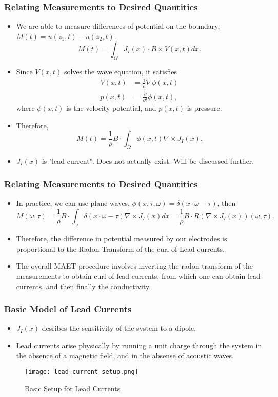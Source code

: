 \documentclass[]{beamer}
\begin{document}
 \begin{frame}
  \frametitle{Relating Measurements to Desired Quantities}
  \begin{itemize}
  \item We are able to measure differences of potential on the boundary, $M(t) = u(z_1,t)-u(z_2,t)$.
      \[
          M(t) = \int_{\Omega}J_{I}(x)\cdot B \times V(x,t)dx.
      \]
    \item Since $V(x,t)$ solves the wave equation, it satisfies
        \begin{align*}
            V(x,t) &= \frac{1}{\rho}\nabla \phi(x,t)\\
            p(x,t) &= \frac{\partial}{\partial t}\phi(x,t),
        \end{align*}
       where $\phi(x,t)$ is the velocity potential, and $p(x,t)$ is pressure.
    \item Therefore,
        \[
            M(t) = \frac{1}{\rho}B \cdot \int_{\Omega}\phi(x,t)\nabla \times J_{I}(x).
        \]
    \item $J_I(x)$ is "lead current". Does not actually exist. Will be discussed further.
\end{itemize}
\end{frame}

\begin{frame}
  \frametitle{Relating Measurements to Desired Quantities}
  \begin{itemize}
  \item In practice, we can use plane waves, $\phi(x,\tau,\omega) = \delta(x\cdot\omega-\tau)$, then
      \[
          M(\omega,\tau)=\frac{1}{\rho}B \cdot \int_{\omega}\delta(x\cdot\omega - \tau)\nabla \times J_{I}(x)dx = \frac{1}{\rho}B\cdot R(\nabla \times J_{I}(x))(\omega,\tau).
      \]
\item Therefore, the difference in potential measured by our electrodes is proportional to the Radon Transform of the curl of Lead currents.
\item The overall MAET procedure involves inverting the radon transform of the measurements to obtain curl of lead currents, from which one can obtain lead currents, and then finally the conductivity.
\end{itemize}
\end{frame}

\begin{frame}
    \frametitle{Basic Model of Lead Currents}
  \begin{itemize}
    \item $J_I(x)$ desribes the sensitivity of the system to a dipole.
    \item Lead currents arise physically by running a unit charge through the system in the absence of a magnetic field, and in the absense of acoustic waves.
\end{itemize}
 \centering
        \begin{figure}
        \texttt{[image: lead\_current\_setup.png]}
        \caption{Basic Setup for Lead Currents}
        \end{figure}
\end{frame}
\end{document}

